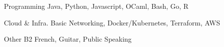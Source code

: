 


\begin{cvskills}


\cvskill
{Programming} %
{Java, Python, Javascript, OCaml, Bash, Go, R} %


\cvskill
{Cloud \& Infra.} %
{Basic Networking, Docker/Kubernetes, Terraform, AWS} %


\cvskill
{Other} %
{B2 French, Guitar, Public Speaking} %


\end{cvskills}
